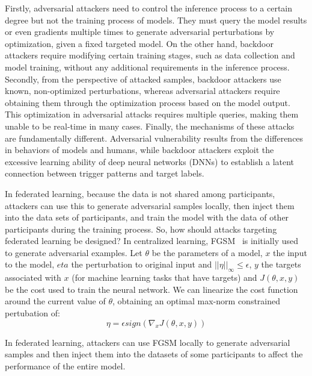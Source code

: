 \documentclass[pdflatex,sn-mathphys-num]{sn-jnl}%
\theoremstyle{thmstyleone}%
\theoremstyle{thmstyletwo}%
\theoremstyle{thmstylethree}%
\begin{document}
Firstly, adversarial attackers need to control the
inference process to a certain degree but not the training
process of models. They must query the model results
or even gradients multiple times to generate adversarial
perturbations by optimization, given a fixed targeted
model. On the other hand, backdoor attackers require
modifying certain training stages, such as data collection
and model training, without any additional requirements
in the inference process. Secondly, from the perspective
of attacked samples, backdoor attackers use known,
non-optimized perturbations, whereas adversarial attackers
require obtaining them through the optimization process
based on the model output. This optimization in
adversarial attacks requires multiple queries, making them unable
to be real-time in many cases. Finally, the mechanisms
of these attacks are fundamentally different. Adversarial
vulnerability results from the differences in behaviors of
models and humans, while backdoor attackers exploit the
excessive learning ability of deep neural networks (DNNs)
to establish a latent connection between trigger patterns
and target labels.

In federated learning, because the data is not shared
among participants, attackers can use this to generate
adversarial samples locally, then inject them into the data
sets of participants, and train the model with the data of
other participants during the training process.
So, how should attacks targeting federated learning be
designed? In centralized learning, FGSM~\cite{goodfellow2014explaining} is initially
used to generate adversarial examples. Let $\theta$ be the parameters of a model, $x$ the input to the model,
$eta$ the perturbation to original input and $||\eta||_\infty \le \epsilon$,
$y$ the targets associated with $x$ (for machine learning tasks that have targets)
and $J(\theta, x, y)$ be the cost used to train the neural network.
We can linearize the cost function around the current value of $\theta$,
obtaining an optimal max-norm constrained pertubation of:
\begin{equation}
	\eta = \epsilon sign(\nabla_x J(\theta,x,y))
\end{equation}

In federated learning, attackers can use FGSM locally to generate
adversarial samples and then inject them into the datasets of some participants
to affect the performance of the entire model.
\end{document}

